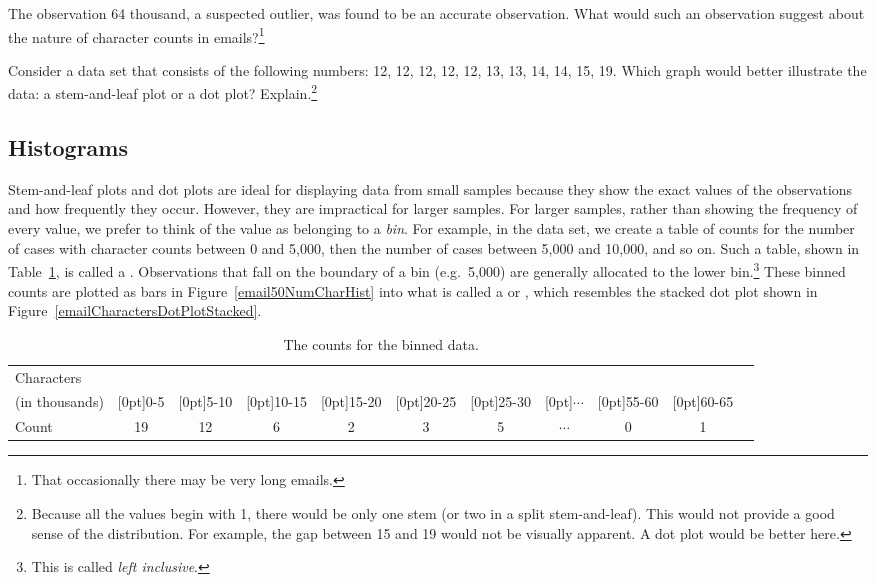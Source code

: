 \begin{exercise}
The observation 64 thousand, a suspected outlier, was found to be an accurate observation. What would such an observation suggest about the nature of character counts in emails?\footnote{That occasionally there may be very long emails.}\end{exercise}

\begin{exercise}
Consider a data set that consists of the following numbers:  12, 12, 12, 12, 12, 13, 13, 14, 14, 15, 19. Which graph would better illustrate the data: a stem-and-leaf plot or a dot plot? Explain.\footnote{Because all the values begin with 1, there would be only one stem (or two in a split stem-and-leaf). This would not provide a good sense of the distribution. For example, the gap between 15 and 19 would not be visually apparent. A dot plot would be better here.}
\end{exercise}


\subsection{Histograms}
\label{histogramsAndShape}

Stem-and-leaf plots and dot plots are ideal for displaying data from small samples because they show the exact values of the observations and how frequently they occur. However, they are impractical for larger samples. For larger samples, rather than showing the frequency of every value, we prefer to think of the value as belonging to a \emph{bin}. For example, in the  data set, we create a table of counts for the number of cases with character counts between 0 and 5,000, then the number of cases between 5,000 and 10,000, and so on. Such a table, shown in Table~\ref{binnedNumCharTable}, is called a . Observations that fall on the boundary of a bin (e.g.~5,000) are generally allocated to the lower bin.\footnote{This is called \emph{left inclusive}.} These binned counts are plotted as bars in Figure~\ref{email50NumCharHist} into what is called a  or , which resembles the stacked dot plot shown in Figure~\ref{emailCharactersDotPlotStacked}.

\begin{table}[ht]
\centering\small
\begin{tabular}{l ccc ccc ccc c}
  \hline
Characters & \\
(in thousands) & \raisebox{1.5ex}[0pt]{0-5} & \raisebox{1.5ex}[0pt]{5-10} & \raisebox{1.5ex}[0pt]{10-15} & \raisebox{1.5ex}[0pt]{15-20} & \raisebox{1.5ex}[0pt]{20-25} & \raisebox{1.5ex}[0pt]{25-30} & \raisebox{1.5ex}[0pt]{$\cdots$} & \raisebox{1.5ex}[0pt]{55-60} & \raisebox{1.5ex}[0pt]{60-65} \\
  \hline
Count & 19 & 12 & 6 & 2 & 3 & 5 & $\cdots$ & 0 & 1 \\
  \hline
\end{tabular}
\caption{The counts for the binned  data.}
\label{binnedNumCharTable}
\end{table}

